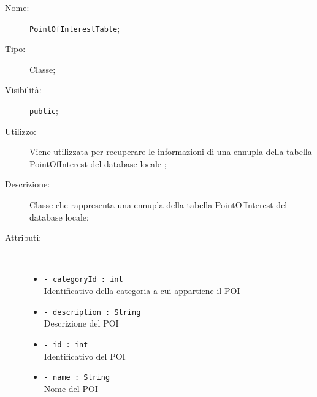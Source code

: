 \documentclass[../DefinizioneDiProdotto.tex]{subfiles}
\begin{document}
\begin{description}
	\item[Nome:] \texttt{PointOfInterestTable};
	\item[Tipo:] Classe;
	\item[Visibilità:] \texttt{public};
	\item[Utilizzo:] Viene utilizzata per recuperare le informazioni di una ennupla della tabella PointOfInterest del database locale ;
	\item[Descrizione:] Classe che rappresenta una ennupla della tabella PointOfInterest del database locale;
	\item[Attributi:] \
	\begin{itemize}
		\item \texttt{- categoryId : int}\\
		Identificativo della categoria a cui appartiene il POI
		
		\item \texttt{- description : String}\\
		Descrizione del POI
		
		\item \texttt{- id : int}\\
		Identificativo del POI
		
		\item \texttt{- name : String}\\
		Nome del POI
		

\end{itemize}
\end{description}
\end{document}
